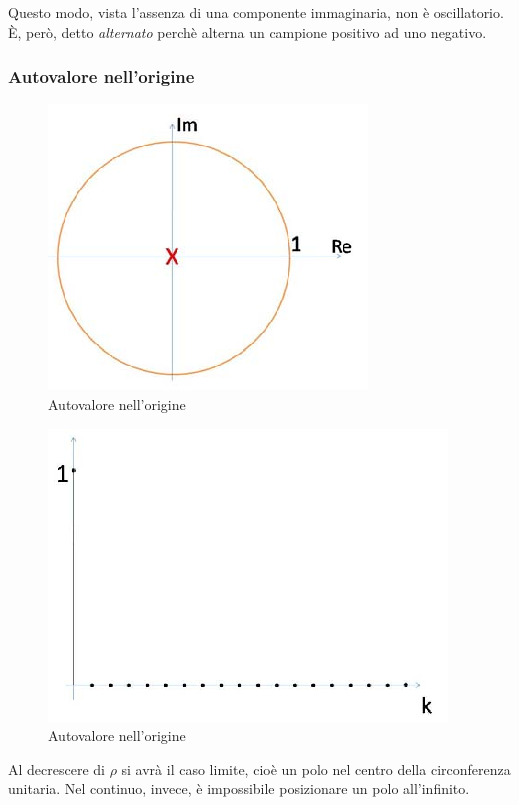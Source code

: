 \documentclass[a4paper]{report}
\begin{document}
Questo modo, vista l'assenza di una componente immaginaria, non \`e
oscillatorio. \`E, per\`o, detto {\em alternato} perch\`e alterna un
campione positivo ad uno negativo.

\subsubsection{Autovalore nell'origine}
\begin{figure}[!h]
  \begin{center}
    \includegraphics[scale=0.4]{./figures/autovaloreNellOrigine00.png}
    \caption{Autovalore nell'origine}\label{fig:autovaloreNellOrigine00}
  \end{center}
\end{figure}
\begin{figure}[!h]
  \begin{center}
    \includegraphics[scale=0.4]{./figures/autovaloreNellOrigine01.png}
    \caption{Autovalore nell'origine}\label{fig:autovaloreNellOrigine01}
  \end{center}
\end{figure}
Al decrescere di $\rho$ si avr\`a il caso limite, cio\`e un polo
nel centro della circonferenza unitaria. Nel continuo, invece, \`e
impossibile posizionare un polo all'infinito.
\end{document}
